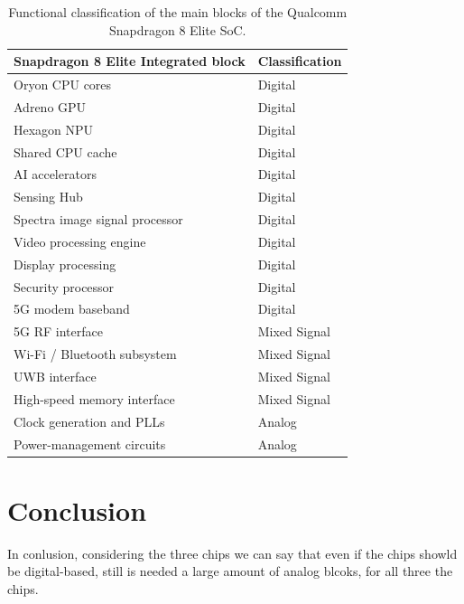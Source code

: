 \documentclass[twocolumn]{article}
\begin{document}
\begin{table}[h]
    \centering
    \begin{tabular}{p{} p{}}
        \hline
        \textbf{Snapdragon 8 Elite Integrated block} & \textbf{Classification} \\
        \hline
        Oryon CPU cores & Digital \\
        Adreno GPU & Digital \\
        Hexagon NPU & Digital \\
        Shared CPU cache & Digital \\
        AI accelerators & Digital \\
        Sensing Hub & Digital \\
        Spectra image signal processor & Digital \\
        Video processing engine & Digital \\
        Display processing & Digital \\
        Security processor & Digital \\
        5G modem baseband & Digital \\
        5G RF interface & Mixed Signal \\
        Wi-Fi / Bluetooth subsystem & Mixed Signal \\
        UWB interface & Mixed Signal \\
        High-speed memory interface & Mixed Signal \\
        Clock generation and PLLs & Analog \\
        Power-management circuits & Analog \\
        \hline
    \end{tabular}
    \caption{Functional classification of the main blocks of the Qualcomm Snapdragon 8 Elite SoC.}
    \label{tab:snapdragon_blocks}
    \renewcommand{\arraystretch}{1.15}
\end{table}

\section{Conclusion}
In conlusion, considering the three chips we can say that even if the chips showld be digital-based, still is needed a large amount of analog blcoks, for all three the chips.



\end{document}
